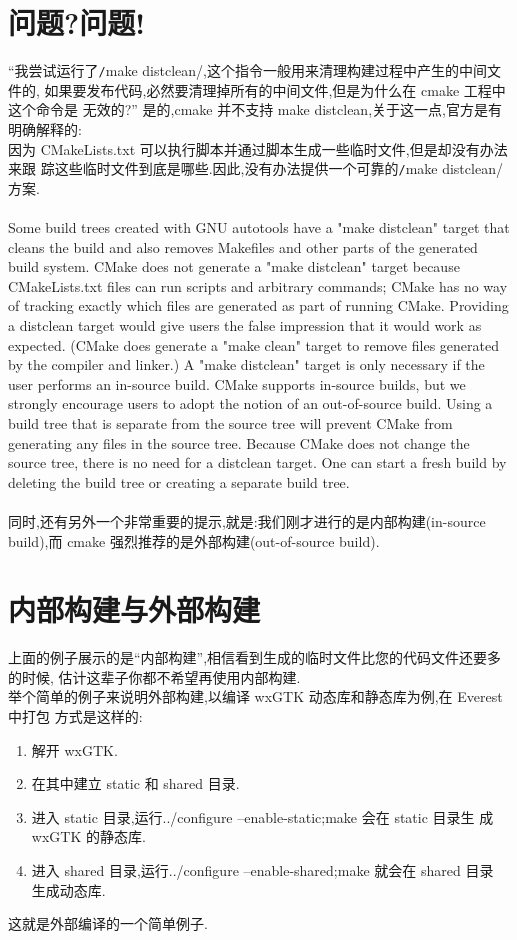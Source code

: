 \documentclass[oneside, 12pt]{book}
\begin{document}
\section{问题?问题!}
“我尝试运行了\texttt/make distclean/,这个指令一般用来清理构建过程中产生的中间文件的, 如果要发布代码,必然要清理掉所有的中间文件,但是为什么在 cmake 工程中这个命令是 无效的?” 是的,cmake 并不支持 make distclean,关于这一点,官方是有明确解释的:\\
因为 CMakeLists.txt 可以执行脚本并通过脚本生成一些临时文件,但是却没有办法来跟 踪这些临时文件到底是哪些.因此,没有办法提供一个可靠的\texttt/make distclean/方案.\\ \\
Some build trees created with GNU autotools have a "make distclean" target that cleans the build and also removes Makefiles and other parts of the generated build system. CMake does not generate a "make distclean" target because CMakeLists.txt files can run scripts and arbitrary commands; CMake has no way of tracking exactly which files are generated as part of running CMake. Providing a distclean target would give users the false impression that it would work as expected. (CMake does generate a "make clean" target to remove files generated by the compiler and linker.)
A "make distclean" target is only necessary if the user performs an in-source build. CMake supports in-source builds, but we strongly encourage users to adopt the notion of an out-of-source build. Using a build tree that is separate from the source tree will prevent CMake from generating any files in the source tree. Because CMake does not change the source tree, there is no need for a distclean target. One can start a fresh build by deleting the build tree or creating a separate build tree.\\ \\

同时,还有另外一个非常重要的提示,就是:我们刚才进行的是内部构建(in-source build),而 cmake 强烈推荐的是外部构建(out-of-source build).
\section{内部构建与外部构建}
上面的例子展示的是“内部构建”,相信看到生成的临时文件比您的代码文件还要多的时候, 估计这辈子你都不希望再使用内部构建.\\
举个简单的例子来说明外部构建,以编译 wxGTK 动态库和静态库为例,在 Everest 中打包 方式是这样的:
\begin{enumerate}
  \item 解开 wxGTK.
  \item 在其中建立 static 和 shared 目录.
  \item 进入 static 目录,运行../configure –enable-static;make 会在 static 目录生 成 wxGTK 的静态库.
  \item 进入 shared 目录,运行../configure –enable-shared;make 就会在 shared 目录 生成动态库.
\end{enumerate}
这就是外部编译的一个简单例子.\\
\end{document}
